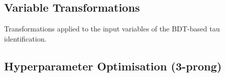 \vspace*{2em}

\subsection{Variable Transformations}
\label{app:variable_transforms}

\begin{table}[htb]
  \centering
  {\def\arraystretch{1.35}\small
    
  }
  \caption[Transformations applied to the input variables of the BDT-based tau
  identification]{Transformations applied to the input variables of the
    BDT-based tau identification.}
\end{table}

\clearpage
\subsection{Hyperparameter Optimisation (3-prong)}
\label{app:grid_search_3p}

